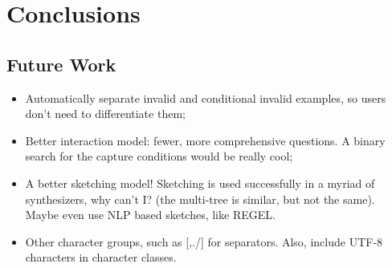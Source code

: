 \chapter{Conclusions}
\label{chapter:conclusions}

\section{Future Work}
\begin{itemize}
    \item Automatically separate invalid and conditional invalid examples, so users don't need to differentiate them;
    
    \item Better interaction model: fewer, more comprehensive questions. A binary search for the capture conditions would be really cool;
    
    \item A better sketching model! Sketching is used successfully in a myriad of synthesizers, why can't I? (the multi-tree is similar, but not the same). Maybe even use NLP based sketches, like REGEL.
    
    \item Other character groups, such as [,./] for separators. Also, include UTF-8 characters in character classes.
\end{itemize}